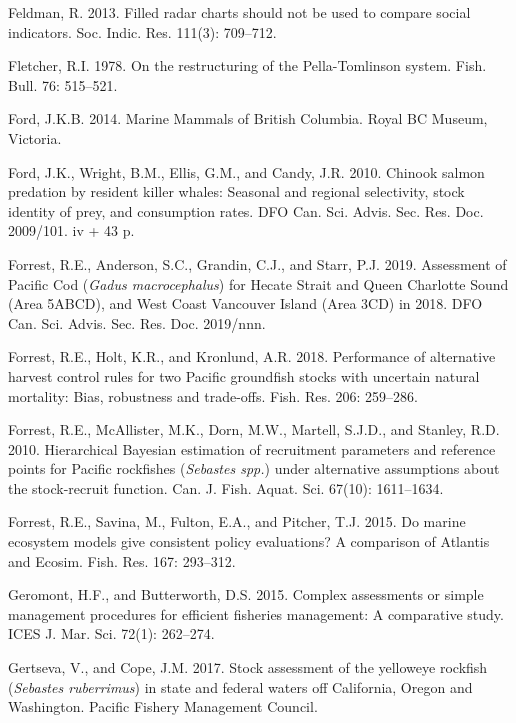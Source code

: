 \documentclass[11pt]{book}
\begin{document}
\leavevmode\hypertarget{ref-feldman2013}{}%
Feldman, R. 2013. Filled radar charts should not be used to compare social indicators. Soc. Indic. Res. 111(3): 709--712.

\leavevmode\hypertarget{ref-fletcher1978}{}%
Fletcher, R.I. 1978. On the restructuring of the Pella-Tomlinson system. Fish. Bull. 76: 515--521.

\leavevmode\hypertarget{ref-ford2014}{}%
Ford, J.K.B. 2014. Marine Mammals of British Columbia. Royal BC Museum, Victoria.

\leavevmode\hypertarget{ref-ford2010}{}%
Ford, J.K., Wright, B.M., Ellis, G.M., and Candy, J.R. 2010. Chinook salmon predation by resident killer whales: Seasonal and regional selectivity, stock identity of prey, and consumption rates. DFO Can. Sci. Advis. Sec. Res. Doc. 2009/101. iv + 43 p.

\leavevmode\hypertarget{ref-forrest2019}{}%
Forrest, R.E., Anderson, S.C., Grandin, C.J., and Starr, P.J. 2019. Assessment of Pacific Cod (\emph{Gadus macrocephalus}) for Hecate Strait and Queen Charlotte Sound (Area 5ABCD), and West Coast Vancouver Island (Area 3CD) in 2018. DFO Can. Sci. Advis. Sec. Res. Doc. 2019/nnn.

\leavevmode\hypertarget{ref-forrest2018}{}%
Forrest, R.E., Holt, K.R., and Kronlund, A.R. 2018. Performance of alternative harvest control rules for two Pacific groundfish stocks with uncertain natural mortality: Bias, robustness and trade-offs. Fish. Res. 206: 259--286.

\leavevmode\hypertarget{ref-forrest2010}{}%
Forrest, R.E., McAllister, M.K., Dorn, M.W., Martell, S.J.D., and Stanley, R.D. 2010. Hierarchical Bayesian estimation of recruitment parameters and reference points for Pacific rockfishes (\emph{Sebastes spp.}) under alternative assumptions about the stock-recruit function. Can. J. Fish. Aquat. Sci. 67(10): 1611--1634.

\leavevmode\hypertarget{ref-forrest2015}{}%
Forrest, R.E., Savina, M., Fulton, E.A., and Pitcher, T.J. 2015. Do marine ecosystem models give consistent policy evaluations? A comparison of Atlantis and Ecosim. Fish. Res. 167: 293--312.

\leavevmode\hypertarget{ref-geromont2015}{}%
Geromont, H.F., and Butterworth, D.S. 2015. Complex assessments or simple management procedures for efficient fisheries management: A comparative study. ICES J. Mar. Sci. 72(1): 262--274.

\leavevmode\hypertarget{ref-gertseva2017}{}%
Gertseva, V., and Cope, J.M. 2017. Stock assessment of the yelloweye rockfish (\emph{Sebastes ruberrimus}) in state and federal waters off California, Oregon and Washington. Pacific Fishery Management Council.
\end{document}

